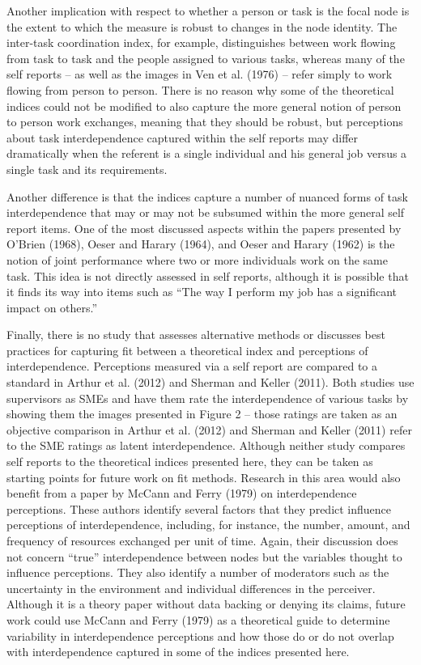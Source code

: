 \documentclass[english,,man]{apa6}
\theoremstyle{definition}
\theoremstyle{definition}
\theoremstyle{definition}
\theoremstyle{remark}
\begin{document}
Another implication with respect to whether a person or task is the
focal node is the extent to which the measure is robust to changes in
the node identity. The inter-task coordination index, for example,
distinguishes between work flowing from task to task and the people
assigned to various tasks, whereas many of the self reports -- as well
as the images in Ven et al. (1976) -- refer simply to work flowing from
person to person. There is no reason why some of the theoretical indices
could not be modified to also capture the more general notion of person
to person work exchanges, meaning that they should be robust, but
perceptions about task interdependence captured within the self reports
may differ dramatically when the referent is a single individual and his
general job versus a single task and its requirements.

Another difference is that the indices capture a number of nuanced forms
of task interdependence that may or may not be subsumed within the more
general self report items. One of the most discussed aspects within the
papers presented by O'Brien (1968), Oeser and Harary (1964), and Oeser
and Harary (1962) is the notion of joint performance where two or more
individuals work on the same task. This idea is not directly assessed in
self reports, although it is possible that it finds its way into items
such as \enquote{The way I perform my job has a significant impact on
others.}

Finally, there is no study that assesses alternative methods or
discusses best practices for capturing fit between a theoretical index
and perceptions of interdependence. Perceptions measured via a self
report are compared to a standard in Arthur et al. (2012) and Sherman
and Keller (2011). Both studies use supervisors as SMEs and have them
rate the interdependence of various tasks by showing them the images
presented in Figure 2 -- those ratings are taken as an objective
comparison in Arthur et al. (2012) and Sherman and Keller (2011) refer
to the SME ratings as latent interdependence. Although neither study
compares self reports to the theoretical indices presented here, they
can be taken as starting points for future work on fit methods. Research
in this area would also benefit from a paper by McCann and Ferry (1979)
on interdependence perceptions. These authors identify several factors
that they predict influence perceptions of interdependence, including,
for instance, the number, amount, and frequency of resources exchanged
per unit of time. Again, their discussion does not concern
\enquote{true} interdependence between nodes but the variables thought
to influence perceptions. They also identify a number of moderators such
as the uncertainty in the environment and individual differences in the
perceiver. Although it is a theory paper without data backing or denying
its claims, future work could use McCann and Ferry (1979) as a
theoretical guide to determine variability in interdependence
perceptions and how those do or do not overlap with interdependence
captured in some of the indices presented here.
\end{document}
